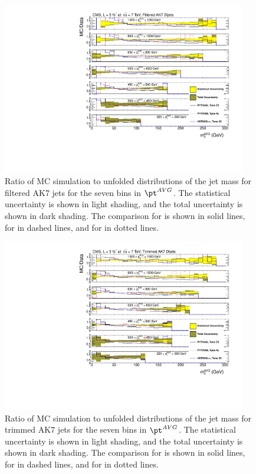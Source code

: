 \begin{figure}[htbp]
\centering
\includegraphics[width=0.95\textwidth]{figs/unfoldedMeasurementDijets_allfrac__Filtered}
\caption{Ratio of MC simulation to unfolded distributions of the jet mass for filtered AK7 jets for the seven bins in $\pt^{AVG}$.
The statistical uncertainty is shown in light shading, and the
total uncertainty is shown in dark shading.
The comparison for \PYTHIA is shown in solid lines, for \PYTHIAEIGHT in dashed lines, and for \HERWIG in dotted lines.
\label{figs:unfoldedMeasurementDijets_allfrac_Filtered}}
\end{figure}


\begin{figure}[htbp]
\centering
\includegraphics[width=0.95\textwidth]{figs/unfoldedMeasurementDijets_allfrac__Trimmed}
\caption{Ratio of MC simulation to unfolded distributions of the jet mass for trimmed AK7 jets for the seven bins in $\pt^{AVG}$.
The statistical uncertainty is shown in light shading, and the
total uncertainty is shown in dark shading.
The comparison for \PYTHIA is shown in solid lines, for \PYTHIAEIGHT in dashed lines, and for \HERWIG in dotted lines.
\label{figs:unfoldedMeasurementDijets_allfrac_Trimmed}}
\end{figure}

